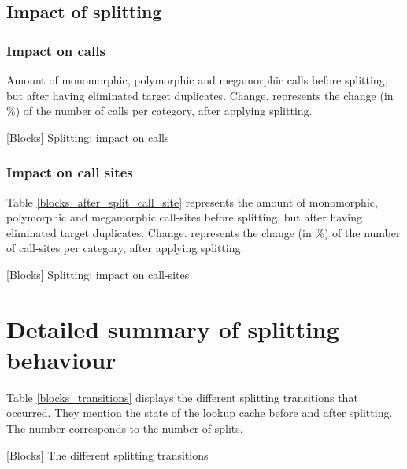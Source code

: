 \documentclass[10pt, sigplan, preprint]{acmart}
\begin{document}
\subsection{Impact of splitting}

\subsubsection{\textbf{Impact on calls}}

Amount of monomorphic, polymorphic and megamorphic calls before splitting, but after having eliminated target duplicates.
Change. represents the change (in \%) of the number of calls per category, after applying splitting.

\begin{table}[h!]
	\centering
	\tiny
	\BlockAfterSplitCallsMini
	\caption{[Blocks] Splitting: impact on calls}
\end{table}

\subsubsection{\textbf{Impact on call sites}}

Table \ref{blocks_after_split_call_site} represents the amount of monomorphic, polymorphic and megamorphic call-sites before splitting, but after having eliminated target duplicates.
Change. represents the change (in \%) of the number of call-sites per category, after applying splitting.

\begin{table}[h!]
	\centering
	\tiny
	\BlockAfterSplitSites
	\caption{[Blocks] Splitting: impact on call-sites}
	\label{blocks_after_split_call_site}
\end{table}

\section{Detailed summary of splitting behaviour}

Table \ref{blocks_transitions} displays the different splitting transitions that occurred. They mention the state of the lookup cache before and after splitting. The number corresponds to the number of splits.

\begin{table}[h!]
	\centering
	\tiny
	\BlockSplittingTransitions
	\caption{[Blocks] The different splitting transitions}
	\label{blocks_transitions}
\end{table}
\end{document}
